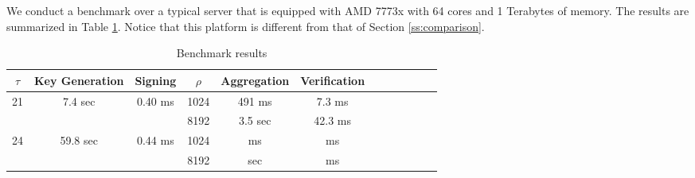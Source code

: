We conduct a benchmark over a typical server that is equipped with AMD 7773x with
64 cores and 1 Terabytes of memory.
The results are summarized in Table \ref{tab:bench_results}.
Notice that this platform is different from that of Section \ref{ss:comparison}.

\begin{table}[t]\centering
  \begin{tabular}{|c|c||c||c|c|c|c|c|c||c|c|c|}\hline
      $\tau$              & Key Generation            & Signing                   & $\rho$  &  Aggregation & Verification  \\ \hline\hline
      \multirow{2}{*}{21} & \multirow{2}{*}{7.4 sec}  & \multirow{2}{*}{0.40 ms}  & 1024    &   491 ms     &  7.3 ms       \\\cline{4-6}
                          &                           &                           & 8192    &   3.5 sec    &  42.3 ms       \\\hline

      \multirow{2}{*}{24} & \multirow{2}{*}{59.8 sec} & \multirow{2}{*}{0.44 ms}  & 1024    &    ms     &   ms       \\\cline{4-6}
                          &                           &                           & 8192    &    sec    &   ms       \\\hline


  \end{tabular}\\
  \caption{Benchmark results}
  \label{tab:bench_results}
\end{table}

